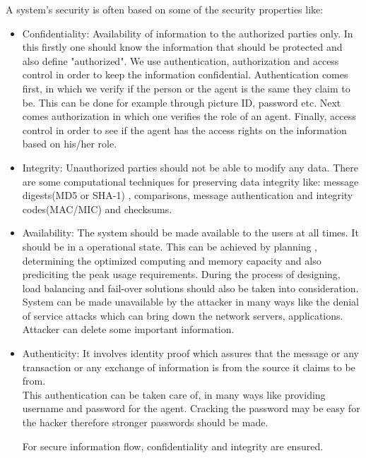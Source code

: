 A system's security is often based on some of the security properties like:
\begin{itemize}
\item  Confidentiality: Availability of information to the authorized parties only. In 
this firstly one should know the information that should be protected and
also define "authorized". We use authentication, authorization and access
control in order to keep the information confidential. Authentication
comes first, in which we verify if the person or the agent is the same 
they claim to be. This can be done for example through picture ID, 
password etc. Next comes authorization in which one verifies the
role of an agent.  Finally, access control in order to see if 
the agent has the access rights on the information based on his/her
role.

\item Integrity: Unauthorized parties should not be able to modify any data.
There are some computational techniques for preserving
data integrity like: message digests(MD5 or SHA-1) , comparisons,
message authentication and integrity codes(MAC/MIC) and checksums.

\item Availability: The system should be made available 
to the users at all times. 
It should be in a operational state.
This can be achieved by planning , determining the optimized computing
and memory capacity and also prediciting the peak usage requirements.
During the process of designing, load balancing and fail-over solutions should also be
taken into consideration.
System can be made unavailable by the attacker
in many ways like the denial of service attacks which can bring
down the network servers, applications. Attacker can 
delete some important information.

\item Authenticity: It involves identity proof which assures that the message or any transaction or any exchange 
of information is from the source it claims to be from.\\ This authentication
can be taken care of, in many ways like providing username and password
for the agent. Cracking the password may be easy for the hacker
therefore stronger passwords should be made. 

For secure information flow, confidentiality and integrity are ensured.

\end{itemize}


